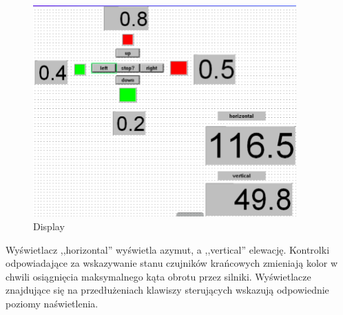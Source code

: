 \documentclass[a4paper, 12pt]{article}
\begin{document}
		\begin{figure}[H]
			\centering
			\includegraphics[width = 0.9\textwidth]{./img/display.png}
			\caption{Display}
		\end{figure}
		\noindent
		Wyświetlacz ,,horizontal'' wyświetla azymut, a ,,vertical'' elewację. Kontrolki odpowiadające za wskazywanie stanu czujników krańcowych zmieniają kolor w chwili osiągnięcia maksymalnego kąta obrotu przez silniki. Wyświetlacze znajdujące się na przedłużeniach klawiszy sterujących wskazują odpowiednie poziomy naświetlenia.
\end{document}
